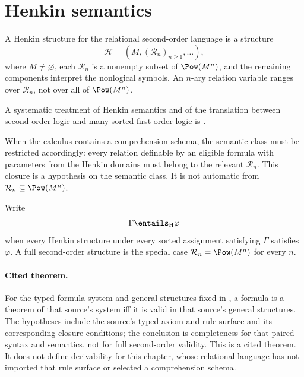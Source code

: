 \section{Henkin semantics}
\label{sec:second-order-logic-05}

\begin{definition}
A Henkin structure for the relational second-order language is a structure
\[
  \mathcal H=(M,(\mathcal R_n)_{n\geq1},\ldots),
\]
where \(M\ne\varnothing\), each
\(\mathcal R_n\) is a nonempty subset of \(\Pow(M^n)\), and the remaining
components interpret the nonlogical symbols.  An \(n\)-ary relation variable
ranges over \(\mathcal R_n\), not over all of \(\Pow(M^n)\).
\end{definition}

A systematic treatment of Henkin semantics and of the translation between
second-order logic and many-sorted first-order logic is
\cite{Manzano1996}.

When the calculus contains a comprehension schema, the semantic class
must be restricted accordingly: every relation definable by an eligible
formula with parameters from the Henkin domains must belong to the relevant
\(\mathcal R_n\).  This closure is a hypothesis on the semantic class.  It is
not automatic from \(\mathcal R_n\subseteq\Pow(M^n)\).

\begin{definition}
Write
\[
  \Gamma\entails_{\mathrm H}\varphi
\]
when every Henkin structure under every sorted assignment satisfying
\(\Gamma\) satisfies \(\varphi\).  A full second-order structure is the
special case
\(\mathcal R_n=\Pow(M^n)\) for every \(n\).
\end{definition}

\paragraph{Cited theorem.}
For the typed formula system and general structures fixed in
\cite[pp.~81--91]{Henkin1950}, a formula is a theorem of that source's system
iff it is valid in that source's general structures.  The hypotheses
include the source's typed axiom and rule surface and its corresponding closure
conditions; the conclusion is completeness for that paired syntax and
semantics, not for full second-order validity.  This is a cited theorem.  It
does not define derivability for this chapter, whose relational language has
not imported that rule surface or selected a comprehension schema.

